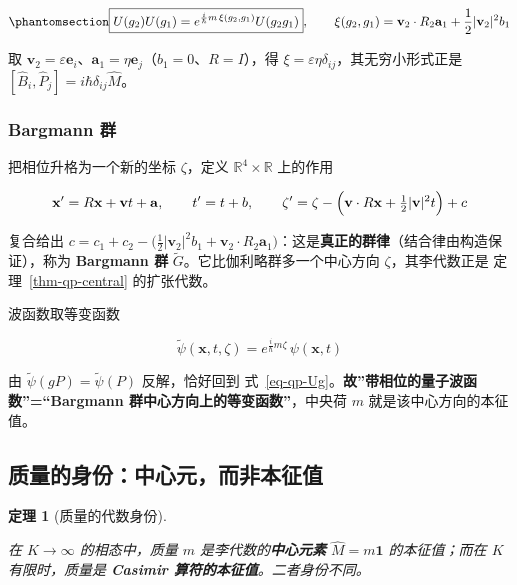 \documentclass[
  chinese,
  a4paper,
  UTF8,
  12pt,
  oneside,
  openany]{ctexbook}
\theoremstyle{plain}
\newtheorem{theorem}{定理}[chapter]
\theoremstyle{plain}
\theoremstyle{plain}
\theoremstyle{definition}
\theoremstyle{plain}
\theoremstyle{plain}
\theoremstyle{remark}
\begin{document}
\begin{equation}\protect\phantomsection\label{eq-qp-cocycle-explicit}{
\boxed{U(g_2)U(g_1)=e^{\frac{i}{\hbar}m\,\xi(g_2,g_1)}U(g_2g_1)},\qquad
\xi(g_2,g_1)=\mathbf v_2\cdot R_2\mathbf a_1+\frac{1}{2}\lvert\mathbf v_2\rvert^{2}b_1
}\end{equation}

取
\(\mathbf v_2=\varepsilon\mathbf e_i\)、\(\mathbf a_1=\eta\mathbf e_j\)（\(b_1=0\)、\(R=I\)），得
\(\xi=\varepsilon\eta\delta_{ij}\)，其无穷小形式正是
\([\hat B_i,\hat P_j]=i\hbar\delta_{ij}\hat M\)。

\subsubsection{Bargmann 群}\label{bargmann-ux7fa4}

把相位升格为一个新的坐标 \(\zeta\)，定义
\(\mathbb R^{4}\times\mathbb R\) 上的作用

\[
\mathbf x'=R\mathbf x+\mathbf v t+\mathbf a,\qquad t'=t+b,\qquad
\zeta'=\zeta-\Bigl(\mathbf v\cdot R\mathbf x+\tfrac12\lvert\mathbf v\rvert^{2}t\Bigr)+c
\]

复合给出
\(c=c_1+c_2-\bigl(\tfrac12\lvert\mathbf v_2\rvert^{2}b_1+\mathbf v_2\cdot R_2\mathbf a_1\bigr)\)：这是\textbf{真正的群律}（结合律由构造保证），称为
\textbf{Bargmann 群} \(\widetilde G\)。它比伽利略群多一个中心方向
\(\zeta\)，其李代数正是 定理~\ref{thm-qp-central} 的扩张代数。

波函数取等变函数

\[
\widetilde\psi(\mathbf x,t,\zeta)=e^{\frac{i}{\hbar}m\zeta}\,\psi(\mathbf x,t)
\]

由 \(\widetilde\psi(gP)=\widetilde\psi(P)\) 反解，恰好回到
式~\ref{eq-qp-Ug}。\textbf{故''带相位的量子波函数''=``Bargmann
群中心方向上的等变函数''}，中央荷 \(m\) 就是该中心方向的本征值。

\subsection{质量的身份：中心元，而非本征值}\label{sec-qp-mass}

\begin{theorem}[质量的代数身份]\protect\hypertarget{thm-qp-mass}{}\label{thm-qp-mass}

在 \(K\to\infty\) 的相态中，质量 \(m\) 是李代数的\textbf{中心元素}
\(\hat M=m\mathbf 1\) 的本征值；而在 \(K\) 有限时，质量是
\textbf{Casimir 算符的本征值}。二者身份不同。

\end{theorem}
\end{document}
